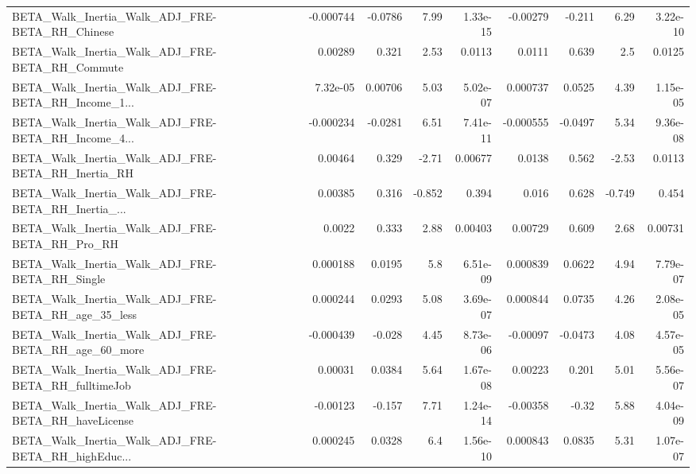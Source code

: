 \begin{tabular}{lrrrrrrrr}
BETA\_Walk\_Inertia\_Walk\_ADJ\_FRE-BETA\_RH\_Chinese     &   -0.000744 &      -0.0786 &     7.99 & 1.33e-15 &   -0.00279 &      -0.211 &         6.29 &      3.22e-10 \\
BETA\_Walk\_Inertia\_Walk\_ADJ\_FRE-BETA\_RH\_Commute     &     0.00289 &        0.321 &     2.53 &   0.0113 &     0.0111 &       0.639 &          2.5 &        0.0125 \\
BETA\_Walk\_Inertia\_Walk\_ADJ\_FRE-BETA\_RH\_Income\_1... &    7.32e-05 &      0.00706 &     5.03 & 5.02e-07 &   0.000737 &      0.0525 &         4.39 &      1.15e-05 \\
BETA\_Walk\_Inertia\_Walk\_ADJ\_FRE-BETA\_RH\_Income\_4... &   -0.000234 &      -0.0281 &     6.51 & 7.41e-11 &  -0.000555 &     -0.0497 &         5.34 &      9.36e-08 \\
BETA\_Walk\_Inertia\_Walk\_ADJ\_FRE-BETA\_RH\_Inertia\_RH  &     0.00464 &        0.329 &    -2.71 &  0.00677 &     0.0138 &       0.562 &        -2.53 &        0.0113 \\
BETA\_Walk\_Inertia\_Walk\_ADJ\_FRE-BETA\_RH\_Inertia\_... &     0.00385 &        0.316 &   -0.852 &    0.394 &      0.016 &       0.628 &       -0.749 &         0.454 \\
BETA\_Walk\_Inertia\_Walk\_ADJ\_FRE-BETA\_RH\_Pro\_RH      &      0.0022 &        0.333 &     2.88 &  0.00403 &    0.00729 &       0.609 &         2.68 &       0.00731 \\
BETA\_Walk\_Inertia\_Walk\_ADJ\_FRE-BETA\_RH\_Single      &    0.000188 &       0.0195 &      5.8 & 6.51e-09 &   0.000839 &      0.0622 &         4.94 &      7.79e-07 \\
BETA\_Walk\_Inertia\_Walk\_ADJ\_FRE-BETA\_RH\_age\_35\_less &    0.000244 &       0.0293 &     5.08 & 3.69e-07 &   0.000844 &      0.0735 &         4.26 &      2.08e-05 \\
BETA\_Walk\_Inertia\_Walk\_ADJ\_FRE-BETA\_RH\_age\_60\_more &   -0.000439 &       -0.028 &     4.45 & 8.73e-06 &   -0.00097 &     -0.0473 &         4.08 &      4.57e-05 \\
BETA\_Walk\_Inertia\_Walk\_ADJ\_FRE-BETA\_RH\_fulltimeJob &     0.00031 &       0.0384 &     5.64 & 1.67e-08 &    0.00223 &       0.201 &         5.01 &      5.56e-07 \\
BETA\_Walk\_Inertia\_Walk\_ADJ\_FRE-BETA\_RH\_haveLicense &    -0.00123 &       -0.157 &     7.71 & 1.24e-14 &   -0.00358 &       -0.32 &         5.88 &      4.04e-09 \\
BETA\_Walk\_Inertia\_Walk\_ADJ\_FRE-BETA\_RH\_highEduc... &    0.000245 &       0.0328 &      6.4 & 1.56e-10 &   0.000843 &      0.0835 &         5.31 &      1.07e-07 \\

\end{tabular}
